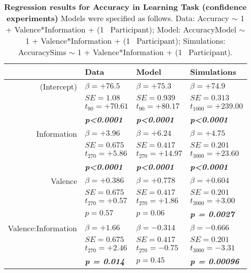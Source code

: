 \begin{table}
\centering \footnotesize
\begin{tabular}{r|lll}
\hline \hline
& \textbf{Data}& \textbf{Model}& \textbf{Simulations} \\
\hline
\hline (Intercept)&$\beta=+76.5$&$\beta=+75.3$&$\beta=+74.9$\\
&$SE=1.08$&$SE=0.939$&$SE=0.313$\\
&$t_{90}=+70.61$&$t_{90}=+80.17$&$t_{1000}=+239.00$\\
&\textbf{\textit{p\textless0.0001}}&\textbf{\textit{p\textless0.0001}}&\textbf{\textit{p\textless0.0001}}\\
\hline Information&$\beta=+3.96$&$\beta=+6.24$&$\beta=+4.75$\\
&$SE=0.675$&$SE=0.417$&$SE=0.201$\\
&$t_{270}=+5.86$&$t_{270}=+14.97$&$t_{3000}=+23.60$\\
&\textbf{\textit{p\textless0.0001}}&\textbf{\textit{p\textless0.0001}}&\textbf{\textit{p\textless0.0001}}\\
\hline Valence&$\beta=+0.386$&$\beta=+0.778$&$\beta=+0.604$\\
&$SE=0.675$&$SE=0.417$&$SE=0.201$\\
&$t_{270}=+0.57$&$t_{270}=+1.86$&$t_{3000}=+3.00$\\
&$p=0.57$&$p=0.06$&\textbf{\textit{p = 0.0027}}\\
\hline Valence:Information&$\beta=+1.66$&$\beta=-0.314$&$\beta=-0.666$\\
&$SE=0.675$&$SE=0.417$&$SE=0.201$\\
&$t_{270}=+2.46$&$t_{270}=-0.75$&$t_{3000}=-3.31$\\
&\textbf{\textit{p = 0.014}}&$p=0.45$&\textbf{\textit{p = 0.00096}}\\
\hline \hline
\end{tabular}
\caption{\textbf{Regression results for Accuracy in Learning Task (confidence experiments)} Models were specified as follows. Data: Accuracy $\sim$ 1 + Valence*Information + (1 \textbar \ Participant); Model: AccuracyModel $\sim$ 1 + Valence*Information + (1 \textbar \ Participant); Simulations: AccuracySims $\sim$ 1 + Valence*Information + (1 \textbar \ Participant).}
\label{tab:regAccuracy_allexp}
\end{table}
